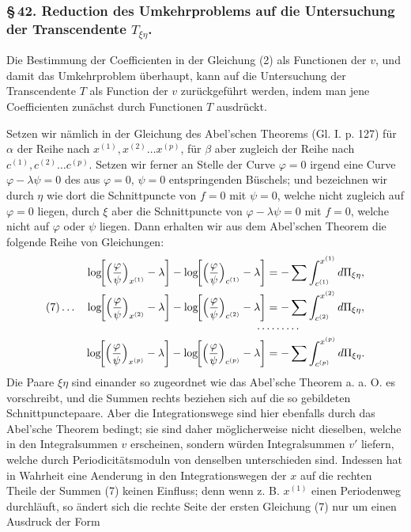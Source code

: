 \documentclass[10pt]{article}
\begin{document}
\subsubsection*{\S\,42. Reduction des Umkehrproblems auf die Untersuchung der Transcendente \(T_{\xi\eta}\).}

Die Bestimmung der Coefficienten in der Gleichung (2) als Functionen der \(v\), und damit das Umkehrproblem überhaupt, kann auf die Untersuchung der Transcendente \(T\) als Function der \(v\) zurückgeführt werden, indem man jene Coefficienten zunächst durch Functionen \(T\) ausdrückt.

Setzen wir nämlich in der Gleichung des Abel'schen Theorems (Gl. I. p. 127) für \(\alpha\) der Reihe nach \(x^{(1)},x^{(2)}\ldots x^{(p)}\), für \(\beta\) aber zugleich der Reihe nach \(c^{(1)},c^{(2)}\ldots c^{(p)}\). Setzen wir ferner an Stelle der Curve \(\varphi=0\) irgend eine Curve \(\varphi-\lambda\psi=0\) des aus \(\varphi=0\), \(\psi=0\) entspringenden Büschels; und bezeichnen wir durch \(\eta\) wie dort die Schnittpuncte von \(f=0\) mit \(\psi=0\), welche nicht zugleich auf \(\varphi=0\) liegen, durch \(\xi\) aber die Schnittpuncte von \(\varphi-\lambda\psi=0\) mit \(f=0\), welche nicht auf \(\varphi\) oder \(\psi\) liegen. Dann erhalten wir aus dem Abel'schen Theorem die folgende Reihe von Gleichungen:
\[
\begin{aligned}
\log\!\biggl[\Bigl(\frac{\varphi}{\psi}\Bigr)_{x^{(1)}}-\lambda\biggr]
-\log\!\biggl[\Bigl(\frac{\varphi}{\psi}\Bigr)_{c^{(1)}}-\lambda\biggr]
&=-\sum\int_{c^{(1)}}^{x^{(1)}}d\Pi_{\xi\eta},\\
(7)\ldots\quad
\log\!\biggl[\Bigl(\frac{\varphi}{\psi}\Bigr)_{x^{(2)}}-\lambda\biggr]
-\log\!\biggl[\Bigl(\frac{\varphi}{\psi}\Bigr)_{c^{(2)}}-\lambda\biggr]
&=-\sum\int_{c^{(2)}}^{x^{(2)}}d\Pi_{\xi\eta},\\[-0.3em]
&\hspace{-1.0em}\cdots\cdots\cdots\\[-0.3em]
\log\!\biggl[\Bigl(\frac{\varphi}{\psi}\Bigr)_{x^{(p)}}-\lambda\biggr]
-\log\!\biggl[\Bigl(\frac{\varphi}{\psi}\Bigr)_{c^{(p)}}-\lambda\biggr]
&=-\sum\int_{c^{(p)}}^{x^{(p)}}d\Pi_{\xi\eta}.
\end{aligned}
\]
Die Paare \(\xi\eta\) sind einander so zugeordnet wie das Abel'sche Theorem a. a. O. es vorschreibt, und die Summen rechts beziehen sich auf die so gebildeten Schnittpunctepaare. Aber die Integrationswege sind hier ebenfalls durch das Abel'sche Theorem bedingt; sie sind daher möglicherweise nicht dieselben, welche in den Integralsummen \(v\) erscheinen, sondern würden Integralsummen \(v'\) liefern, welche durch Periodicitätsmoduln von denselben unterschieden sind. Indessen hat in Wahrheit eine Aenderung in den Integrationswegen der \(x\) auf die rechten Theile der Summen (7) keinen Einfluss; denn wenn z. B. \(x^{(1)}\) einen Periodenweg durchläuft, so ändert sich die rechte Seite der ersten Gleichung (7) nur um einen Ausdruck der Form
\end{document}
